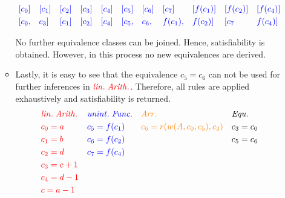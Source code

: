 \documentclass[11pt,a4paper]{article}
\begin{document}
\begin{enumerate}
\begin{itemize}
\hspace*{\dimexpr-\leftmargini-\leftmarginii}\parbox{\linewidth}{%
\begin{align*}
& \textcolor{blue}{[c_0]} && \textcolor{blue}{[c_1]} &&  \textcolor{blue}{[c_2]}  && \textcolor{blue}{[c_3]} && \textcolor{blue}{[c_4]} && \textcolor{blue}{[c_5]} && \textcolor{blue}{[c_6]} && \textcolor{blue}{[c_7]} && \textcolor{blue}{[f(c_1)]} &&  \textcolor{blue}{[f(c_2)]} &&  \textcolor{blue}{[f(c_4)]}&\\
& \textcolor{blue}{[c_0,} && \textcolor{blue}{c_3]} &&  \textcolor{blue}{[c_1]}  && \textcolor{blue}{[c_2]} && \textcolor{blue}{[c_4]} && \textcolor{blue}{[c_5,} && \textcolor{blue}{c_6,} && \textcolor{blue}{f(c_1),} && \textcolor{blue}{f(c_2)]} &&  \textcolor{blue}{[c_7} &&  \textcolor{blue}{f(c_4)]}&\\
\end{align*}}\par

No further equivalence classes can be joined. Hence, satisfiability is obtained. However, in this process no new equivalences are derived.

\item Lastly, it is easy to see that the equivalence $c_5 = c_6$ can not be used for further inferences in $ \textcolor{red}{ \mathit{lin. \; Arith.} }$. Therefore, all rules are applied exhaustively and satisfiability is returned.
\begin{align*}
& \textcolor{red}{ \mathit{lin. \; Arith.} }  && \textcolor{blue}{ \mathit{unint. \; Func.}} && \textcolor{orange}{ \mathit{Arr.}} && \mathit{Equ.}  &\\
& \textcolor{red}{c_0 = a }  && \textcolor{blue}{ c_5 = f(c_1)  } && \textcolor{orange}{ c_6 = r(w(A, c_0, c_5), c_3) } && c_3 = c_0 &\\
& \textcolor{red}{c_1 = b }  && \textcolor{blue}{ c_6 = f(c_2) } && \textcolor{orange}{ } &&  c_5 = c_6 &\\
& \textcolor{red}{c_2 = d }  && \textcolor{blue}{ c_7 = f(c_4) } && \textcolor{orange}{ } &&  &\\
& \textcolor{red}{c_3 = c +1  }  && \textcolor{blue}{ } && \textcolor{orange}{ } &&  &\\
& \textcolor{red}{c_4 = d-1 }  && \textcolor{blue}{ } && \textcolor{orange}{ } &&  &\\
& \textcolor{red}{ c = a - 1}  && \textcolor{blue}{ } && \textcolor{orange}{ } &&  &\\
\end{align*}
\end{itemize}


\end{enumerate}
\end{document}

